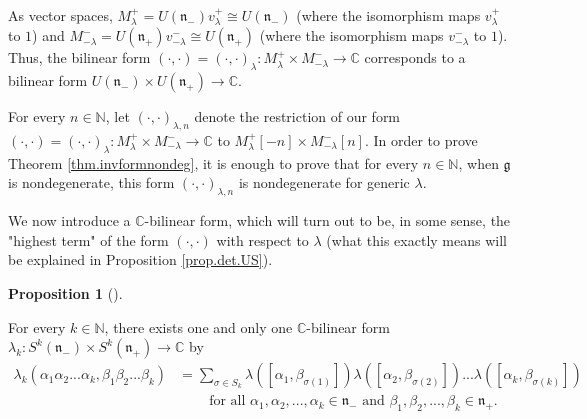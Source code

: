 \documentclass
[numbers=enddot,12pt,final,onecolumn,german,notitlepage]{scrartcl}%
\theoremstyle{definition}
\newtheorem{prop}[theo]{Proposition}
\newenvironment{proposition}[1][]
{\begin{prop}[#1]\begin{leftbar}}
{\end{leftbar}\end{prop}}
\begin{document}
As vector spaces, $M_{\lambda}^{+}=U\left(  \mathfrak{n}_{-}\right)
v_{\lambda}^{+}\cong U\left(  \mathfrak{n}_{-}\right)  $ (where the
isomorphism maps $v_{\lambda}^{+}$ to $1$) and $M_{-\lambda}^{-}=U\left(
\mathfrak{n}_{+}\right)  v_{-\lambda}^{-}\cong U\left(  \mathfrak{n}%
_{+}\right)  $ (where the isomorphism maps $v_{-\lambda}^{-}$ to $1$). Thus,
the bilinear form $\left(  \cdot,\cdot\right)  =\left(  \cdot,\cdot\right)
_{\lambda}:M_{\lambda}^{+}\times M_{-\lambda}^{-}\rightarrow\mathbb{C}$
corresponds to a bilinear form $U\left(  \mathfrak{n}_{-}\right)  \times
U\left(  \mathfrak{n}_{+}\right)  \rightarrow\mathbb{C}$.

For every $n\in\mathbb{N}$, let $\left(  \cdot,\cdot\right)  _{\lambda,n}$
denote the restriction of our form $\left(  \cdot,\cdot\right)  =\left(
\cdot,\cdot\right)  _{\lambda}:M_{\lambda}^{+}\times M_{-\lambda}%
^{-}\rightarrow\mathbb{C}$ to $M_{\lambda}^{+}\left[  -n\right]  \times
M_{-\lambda}^{-}\left[  n\right]  $. In order to prove Theorem
\ref{thm.invformnondeg}, it is enough to prove that for every $n\in\mathbb{N}%
$, when $\mathfrak{g}$ is nondegenerate, this form $\left(  \cdot
,\cdot\right)  _{\lambda,n}$ is nondegenerate for generic $\lambda$.

We now introduce a $\mathbb{C}$-bilinear form, which will turn out to be, in
some sense, the "highest term" of the form $\left(  \cdot,\cdot\right)  $ with
respect to $\lambda$ (what this exactly means will be explained in Proposition
\ref{prop.det.US}).

\begin{proposition}
\label{prop.lambda_k}For every $k\in\mathbb{N}$, there exists one and only one
$\mathbb{C}$-bilinear form $\lambda_{k}:S^{k}\left(  \mathfrak{n}_{-}\right)
\times S^{k}\left(  \mathfrak{n}_{+}\right)  \rightarrow\mathbb{C}$ by
\begin{align}
\lambda_{k}\left(  \alpha_{1}\alpha_{2}...\alpha_{k},\beta_{1}\beta
_{2}...\beta_{k}\right)   &  =\sum\limits_{\sigma\in S_{k}}\lambda\left(
\left[  \alpha_{1},\beta_{\sigma\left(  1\right)  }\right]  \right)
\lambda\left(  \left[  \alpha_{2},\beta_{\sigma\left(  2\right)  }\right]
\right)  ...\lambda\left(  \left[  \alpha_{k},\beta_{\sigma\left(  k\right)
}\right]  \right) \nonumber\\
&  \ \ \ \ \ \ \ \ \ \ \text{for all }\alpha_{1},\alpha_{2},...,\alpha_{k}%
\in\mathfrak{n}_{-}\text{ and }\beta_{1},\beta_{2},...,\beta_{k}%
\in\mathfrak{n}_{+}. \label{thm.invformnondeg.pf.lambda}%
\end{align}

\end{proposition}
\end{document}
